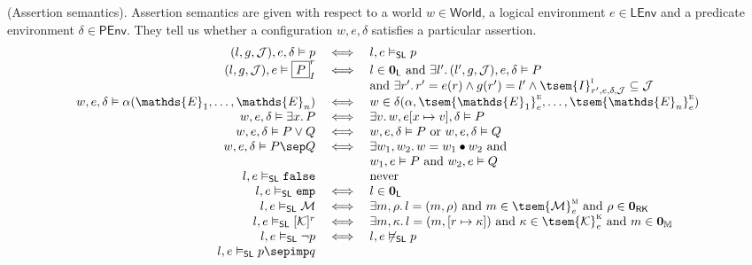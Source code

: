 \begin{defn}
	(Assertion semantics).
	Assertion semantics are given with respect to a world $w \in \mathsf{World}$, a logical environment $e \in \mathsf{LEnv}$ and a predicate environment $\delta \in \mathsf{PEnv}$. They tell us whether a configuration $w, e, \delta$ satisfies a particular assertion.
	\begingroup
	\renewcommand*{\arraystretch}{1.5}
	\[
	\begin{array}{r c l}
		(l, g, \mathcal{J}), e, \delta \vDash p
		&
		\iff
		&
		l, e \vDash_\mathsf{SL} p
	\\
		(l, g, \mathcal{J}), e \vDash \boxed{P}_I^r
		&
		\iff
		&
		l \in \mathbf{0}_\mathsf{L} \text{ and } \exists l' \ldotp (l', g, \mathcal{J}), e, \delta \vDash P
		\\ && \text{and } \exists r' \ldotp r' = e(r) \land g(r') = l' \land \tsem{I}^\textsc{i}_{r', e, \delta, \mathcal{J}} \subseteq \mathcal{J}
	\\
		w, e, \delta \vDash \alpha(\mathds{E}_1, \ldots, \mathds{E}_n)
		&
		\iff
		&
		w \in \delta(\alpha, \tsem{\mathds{E}_1}_e^\textsc{e}, \ldots, \tsem{\mathds{E}_n}_e^\textsc{e})
	\\
		w, e, \delta \vDash \exists x \ldotp P
		&
		\iff
		&
		\exists v \ldotp w, e[x \mapsto v], \delta \vDash P
	\\
		w, e, \delta \vDash P \lor Q
		&
		\iff
		&
		w, e, \delta \vDash P \text{ or } w, e, \delta \vDash Q
	\\
		w, e, \delta \vDash P \sep Q
		&
		\iff
		&
		\exists w_1, w_2 \ldotp w = w_1 \bullet w_2 \text{ and } \\ && w_1, e \vDash P \text{ and } w_2, e \vDash Q
	\\
		l, e \vDash_\mathsf{SL} \mathtt{false}
		&&
		\text{never}
	\\
		l, e \vDash_\mathsf{SL}  \mathtt{emp}
		&
		\iff
		&
		l \in \mathbf{0}_\mathsf{L}
	\\
		l, e \vDash_\mathsf{SL} \mathcal{M}
		&
		\iff
		&
		\exists m, \rho \ldotp l = (m, \rho) \text{ and } m \in \tsem{\mathcal{M}}_e^\textsc{m} \text{ and } \rho \in \mathbf{0}_\mathsf{RK}
	\\
		l, e \vDash_\mathsf{SL} [\mathcal{K}]^r
		&
		\iff
		&
		\exists m, \kappa \ldotp l = (m, [r \mapsto \kappa]) \text{ and } \kappa \in \tsem{\mathcal{K}}_e^\textsc{k} \text{ and } m \in \mathbf{0}_\mathbb{M}
	\\
		l, e \vDash_\mathsf{SL} \lnot p
		&
		\iff
		&
		l, e \not\vDash_\mathsf{SL} p
	\\
		l, e \vDash_\mathsf{SL} p \sepimp q

\end{array}\]
\end{defn}
